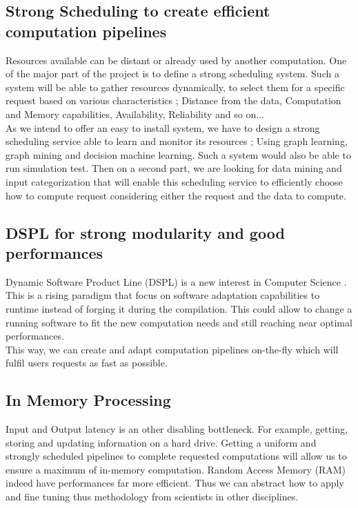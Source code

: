 \documentclass[11pt, twoside]{article}
\begin{document}
		\subsection{Strong Scheduling to create efficient computation pipelines}
			Resources available can be distant or already used by another computation.
			One of the major part of the project is to define a strong scheduling system.
			Such a system will be able to gather resources dynamically, to select them for a specific request based on various characteristics ; Distance from the data, Computation and Memory capabilities, Availability, Reliability and so on...
			\\
			As we intend to offer an easy to install system, we have to design a strong scheduling service able to learn and monitor its resources ; Using graph learning, graph mining and decision machine learning.
			Such a system would also be able to run simulation test.
			Then on a second part, we are looking for data mining and input categorization that will enable this scheduling service to efficiently choose how to compute request considering either the request and the data to compute.

		\subsection{DSPL for strong modularity and good performances}
			Dynamic Software Product Line (DSPL) is a new interest in Computer Science \cite{DSPL}.
			This is a rising paradigm that focus on software adaptation capabilities to runtime instead of forging it during the compilation.
			This could allow to change a running software to fit the new computation needs and still reaching near optimal performances.
			\\
			This way, we can create and adapt computation pipelines on-the-fly which will fulfil users requests as fast as possible.
		
		\subsection{In Memory Processing}
			Input and Output latency is an other disabling bottleneck. For example, getting, storing and updating information on a hard drive.
			Getting a uniform and strongly scheduled pipelines to complete requested computations will allow us to ensure a maximum of in-memory computation.
			Random Access Memory (RAM) indeed have performances far more efficient.
			Thus we can abstract how to apply and fine tuning thus methodology from scientists in other disciplines.
			
\end{document}
